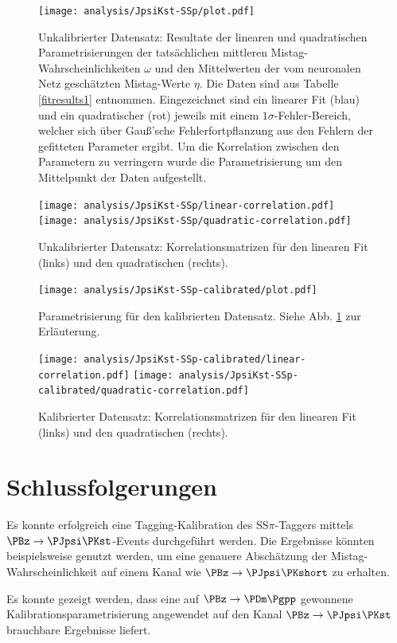 \begin{figure}
  \texttt{[image: analysis/JpsiKst-SSp/plot.pdf]}
  \caption{Unkalibrierter Datensatz: Resultate der linearen und quadratischen Parametrisierungen der tatsächlichen mittleren Mistag-Wahrscheinlichkeiten $ω$ und den Mittelwerten der vom neuronalen Netz geschätzten Mistag-Werte $η$.
  Die Daten sind aus Tabelle \ref{fitresults1} entnommen. Eingezeichnet sind ein linearer Fit (blau) und ein quadratischer (rot) jeweils mit einem $1σ$-Fehler-Bereich, welcher sich über Gauß'sche Fehlerfortpflanzung aus den Fehlern der gefitteten Parameter ergibt.
Um die Korrelation zwischen den Parametern zu verringern wurde die Parametrisierung um den Mittelpunkt der Daten aufgestellt.}
  \label{final-plot1}
\end{figure}

\begin{figure}
  \texttt{[image: analysis/JpsiKst-SSp/linear-correlation.pdf]}
  \texttt{[image: analysis/JpsiKst-SSp/quadratic-correlation.pdf]}
  \caption{Unkalibrierter Datensatz: Korrelationsmatrizen für den linearen Fit (links) und den quadratischen (rechts).}
\end{figure}

\begin{figure}
  \texttt{[image: analysis/JpsiKst-SSp-calibrated/plot.pdf]}
  \caption{Parametrisierung für den kalibrierten Datensatz. Siehe Abb. \ref{final-plot1} zur Erläuterung.}
\end{figure}

\begin{figure}
  \texttt{[image: analysis/JpsiKst-SSp-calibrated/linear-correlation.pdf]}
  \texttt{[image: analysis/JpsiKst-SSp-calibrated/quadratic-correlation.pdf]}
  \caption{Kalibrierter Datensatz: Korrelationsmatrizen für den linearen Fit (links) und den quadratischen (rechts).}
\end{figure}

\section{Schlussfolgerungen}

Es konnte erfolgreich eine Tagging-Kalibration des SS$π$-Taggers mittels $\PBz \to \PJpsi\PKst$-Events durchgeführt werden.
Die Ergebnisse könnten beispielsweise genutzt werden, um eine genauere Abschätzung der Mistag-Wahrscheinlichkeit auf einem Kanal wie $\PBz \to \PJpsi\PKshort$ zu erhalten.

Es konnte gezeigt werden, dass eine auf $\PBz \to \PDm \Pgpp$ gewonnene Kalibrationsparametrisierung angewendet auf den Kanal $\PBz \to \PJpsi\PKst$ brauchbare Ergebnisse liefert.

